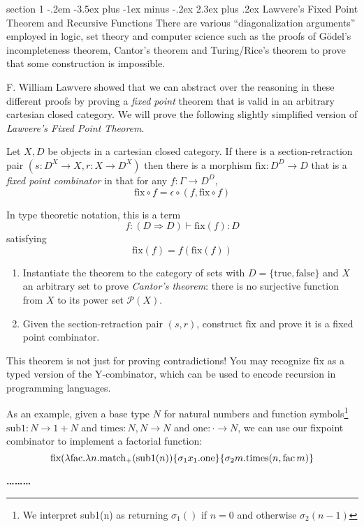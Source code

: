 \documentclass[12pt]{article}
\makeatletter
\newenvironment{problem}{\@startsection
       {section}
       {1}
       {-.2em}
       {-3.5ex plus -1ex minus -.2ex}
       {2.3ex plus .2ex}
       {\pagebreak[3]%
       \large\bf\noindent{Problem }
       }
       }
       {%
       \begin{center}\large\bf \ldots\ldots\ldots\end{center}}
\makeatother
\begin{document}
\begin{problem}{Lawvere's Fixed Point Theorem and Recursive Functions}
  There are various ``diagonalization arguments'' employed in logic,
  set theory and computer science such as the proofs of G\"odel's
  incompleteness theorem, Cantor's theorem and Turing/Rice's theorem
  to prove that some construction is impossible.

  F. William Lawvere showed that we can abstract over the reasoning in
  these different proofs by proving a \emph{fixed point} theorem that
  is valid in an arbitrary cartesian closed category.  We will prove
  the following slightly simplified version of \emph{Lawvere's Fixed
  Point Theorem}.

  Let $X, D$ be objects in a cartesian closed category. If there is a
  section-retraction pair $(s : D^X \to X, r : X \to D^X)$ then there
  is a morphism $\textrm{fix} : D^D \to D$ that is a \emph{fixed point
  combinator} in that for any $f : \Gamma \to D^D$,
  \[ \textrm{fix} \circ f = \epsilon\circ(f, \textrm{fix} \circ f) \]

  In type theoretic notation, this is a term
  \[ f: (D \Rightarrow D) \vdash \textrm{fix}(f) : D \]
  satisfying
  \[ \textrm{fix}(f) = f(\textrm{fix}(f)) \]

  \begin{enumerate}
  \item Instantiate the theorem to the category of sets with $D =
    \{\textrm{true}, \textrm{false} \}$ and $X$ an arbitrary set to
    prove \emph{Cantor's theorem}: there is no surjective function
    from $X$ to its power set $\mathcal P(X)$.

  \item Given the section-retraction pair $(s,r)$, construct
    $\textrm{fix}$ and prove it is a fixed point combinator.
  \end{enumerate}

  This theorem is not just for proving contradictions! You may
  recognize $\textrm{fix}$ as a typed version of the Y-combinator,
  which can be used to encode recursion in programming languages.

  As an example, given a base type $N$ for natural numbers and
  function symbols\footnote{We interpret \textrm{sub1}(n) as returning $\sigma_1()$ if $n=0$ and otherwise $\sigma_2(n - 1)$} $\textrm{sub1} : N \to 1 + N$ and $\textrm{times} : N, N \to N$
  and $\textrm{one} : \cdot \to N$, we can use our fixpoint combinator
  to implement a factorial function:
  \[ \textrm{fix}(\lambda \textrm{fac}.\lambda n. \textrm{match}_+ {(\textrm{sub1}(n))}\{{\sigma_1x_1. \textrm{one}}\}\{{ \sigma_2 m. \textrm{times}(n,\textrm{fac}\,m)}\} \]
\end{problem}
\thispagestyle{empty}


\end{document}
